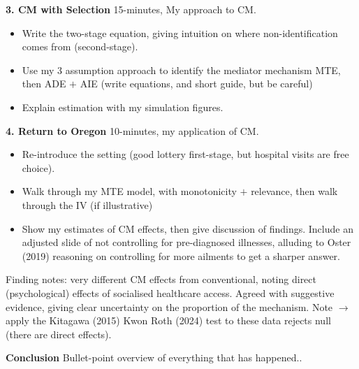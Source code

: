 \documentclass[dvipsnames,handout]{beamer} %
\begin{document}
\begin{frame}
    \textbf{3. CM with Selection}
    15-minutes, My approach to CM.
    \begin{itemize}
        \item Write the two-stage equation, giving intuition on where non-identification comes from (second-stage).
        \item Use my 3 assumption approach to identify the mediator mechanism MTE, then ADE $+$ AIE (write equations, and short guide, but be careful)
        \item Explain estimation with my simulation figures.
    \end{itemize}

    \textbf{4. Return to Oregon}
    10-minutes, my application of CM.
    \begin{itemize}
        \item Re-introduce the setting (good lottery first-stage, but hospital visits are free choice).
        \item Walk through my MTE model, with monotonicity $+$ relevance, then walk through the IV (if illustrative)
        \item Show my estimates of CM effects, then give discussion of findings.  Include an adjusted slide of not controlling for pre-diagnosed illnesses, alluding to Oster (2019) reasoning on controlling for more ailments to get a sharper answer.
    \end{itemize}
    Finding notes: very different CM effects from conventional, noting direct (psychological) effects of socialised healthcare access.
    Agreed with suggestive evidence, giving clear uncertainty on the proportion of the mechanism.
    Note $\to$ apply the Kitagawa (2015) Kwon Roth (2024) test to these data rejects null (there are direct effects). 

    \textbf{Conclusion}
    Bullet-point overview of everything that has happened..
    
\end{frame}
\end{document}

